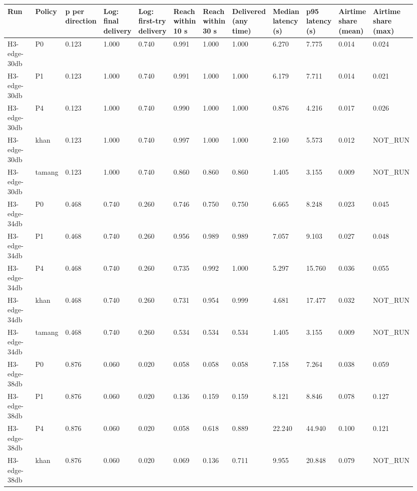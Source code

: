{\scriptsize\raggedright
\begin{longtable}{p{0.079\linewidth}p{0.079\linewidth}p{0.079\linewidth}p{0.079\linewidth}p{0.079\linewidth}p{0.079\linewidth}p{0.079\linewidth}p{0.079\linewidth}p{0.079\linewidth}p{0.079\linewidth}p{0.079\linewidth}p{0.079\linewidth}}
\toprule
Run & Policy & p per direction & Log: final delivery & Log: first-try delivery & Reach within 10 s & Reach within 30 s & Delivered (any time) & Median latency (s) & p95 latency (s) & Airtime share (mean) & Airtime share (max) \\
\midrule
\endhead
H3-edge-30db & P0 & 0.123 & 1.000 & 0.740 & 0.991 & 1.000 & 1.000 & 6.270 & 7.775 & 0.014 & 0.024 \\
H3-edge-30db & P1 & 0.123 & 1.000 & 0.740 & 0.991 & 1.000 & 1.000 & 6.179 & 7.711 & 0.014 & 0.021 \\
H3-edge-30db & P4 & 0.123 & 1.000 & 0.740 & 0.990 & 1.000 & 1.000 & 0.876 & 4.216 & 0.017 & 0.026 \\
H3-edge-30db & khan & 0.123 & 1.000 & 0.740 & 0.997 & 1.000 & 1.000 & 2.160 & 5.573 & 0.012 & NOT\_RUN \\
H3-edge-30db & tamang & 0.123 & 1.000 & 0.740 & 0.860 & 0.860 & 0.860 & 1.405 & 3.155 & 0.009 & NOT\_RUN \\
H3-edge-34db & P0 & 0.468 & 0.740 & 0.260 & 0.746 & 0.750 & 0.750 & 6.665 & 8.248 & 0.023 & 0.045 \\
H3-edge-34db & P1 & 0.468 & 0.740 & 0.260 & 0.956 & 0.989 & 0.989 & 7.057 & 9.103 & 0.027 & 0.048 \\
H3-edge-34db & P4 & 0.468 & 0.740 & 0.260 & 0.735 & 0.992 & 1.000 & 5.297 & 15.760 & 0.036 & 0.055 \\
H3-edge-34db & khan & 0.468 & 0.740 & 0.260 & 0.731 & 0.954 & 0.999 & 4.681 & 17.477 & 0.032 & NOT\_RUN \\
H3-edge-34db & tamang & 0.468 & 0.740 & 0.260 & 0.534 & 0.534 & 0.534 & 1.405 & 3.155 & 0.009 & NOT\_RUN \\
H3-edge-38db & P0 & 0.876 & 0.060 & 0.020 & 0.058 & 0.058 & 0.058 & 7.158 & 7.264 & 0.038 & 0.059 \\
H3-edge-38db & P1 & 0.876 & 0.060 & 0.020 & 0.136 & 0.159 & 0.159 & 8.121 & 8.846 & 0.078 & 0.127 \\
H3-edge-38db & P4 & 0.876 & 0.060 & 0.020 & 0.058 & 0.618 & 0.889 & 22.240 & 44.940 & 0.100 & 0.121 \\
H3-edge-38db & khan & 0.876 & 0.060 & 0.020 & 0.069 & 0.136 & 0.711 & 9.955 & 20.848 & 0.079 & NOT\_RUN \\

\end{longtable}}
